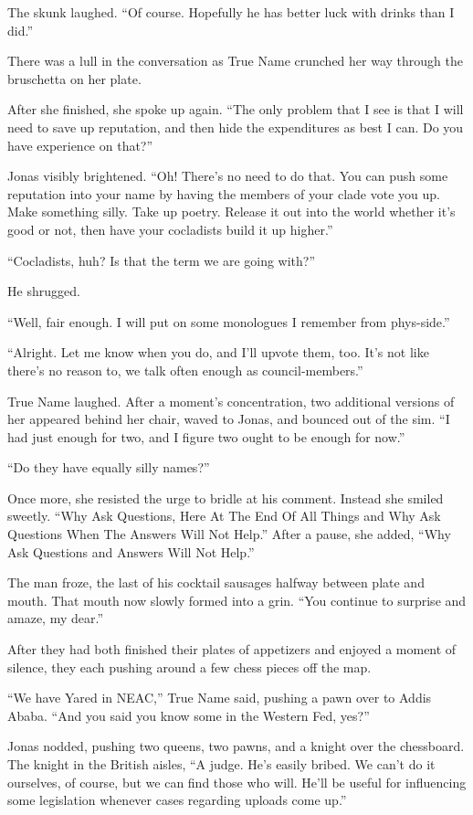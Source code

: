 The skunk laughed. ``Of course. Hopefully he has better luck with drinks than I did.''

There was a lull in the conversation as True Name crunched her way through the bruschetta on her plate.

After she finished, she spoke up again. ``The only problem that I see is that I will need to save up reputation, and then hide the expenditures as best I can. Do you have experience on that?''

Jonas visibly brightened. ``Oh! There's no need to do that. You can push some reputation into your name by having the members of your clade vote you up. Make something silly. Take up poetry. Release it out into the world whether it's good or not, then have your cocladists build it up higher.''

``Cocladists, huh? Is that the term we are going with?''

He shrugged.

``Well, fair enough. I will put on some monologues I remember from phys-side.''

``Alright. Let me know when you do, and I'll upvote them, too. It's not like there's no reason to, we talk often enough as council-members.''

True Name laughed. After a moment's concentration, two additional versions of her appeared behind her chair, waved to Jonas, and bounced out of the sim. ``I had just enough for two, and I figure two ought to be enough for now.''

``Do they have equally silly names?''

Once more, she resisted the urge to bridle at his comment. Instead she smiled sweetly. ``Why Ask Questions, Here At The End Of All Things and Why Ask Questions When The Answers Will Not Help.'' After a pause, she added, ``Why Ask Questions and Answers Will Not Help.''

The man froze, the last of his cocktail sausages halfway between plate and mouth. That mouth now slowly formed into a grin. ``You continue to surprise and amaze, my dear.''

After they had both finished their plates of appetizers and enjoyed a moment of silence, they each pushing around a few chess pieces off the map.

``We have Yared in NEAC,'' True Name said, pushing a pawn over to Addis Ababa. ``And you said you know some in the Western Fed, yes?''

Jonas nodded, pushing two queens, two pawns, and a knight over the chessboard. The knight in the British aisles, ``A judge. He's easily bribed. We can't do it ourselves, of course, but we can find those who will. He'll be useful for influencing some legislation whenever cases regarding uploads come up.''

